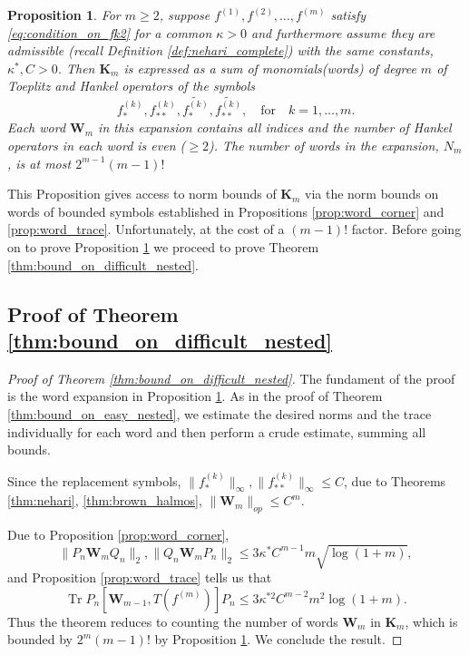 \documentclass[11pt]{amsart}
\theoremstyle{plain}
\newtheorem{proposition}[theorem]{Proposition}
\theoremstyle{remark}
\DeclareMathOperator{\Tr}{Tr}
\numberwithin{equation}{section}
\begin{document}
\begin{proposition}\label{prop:structure_of_nehari_family}
For $m\geq 2$, suppose $f^{(1)}, f^{(2)}, \ldots, f^{(m)}
$ satisfy \eqref{eq:condition_on_fk2} for a common $\kappa>0$ and furthermore assume they are admissible (recall Definition \ref{def:nehari_complete}) with the same constants, $\kappa^*, C>0$.
Then $\mathbf{K}_m$
%
%
is expressed as a sum of monomials(words) of degree $m$ of Toeplitz and Hankel operators of the symbols
$$f^{(k)}_*, f^{(k)}_{**}, \widetilde{f^{(k)}_*}, \widetilde{f^{(k)}_{**}},\quad \text{for}\quad k=1,\ldots, m.$$ 
%
%
%
Each word $\mathbf{W}_m$ in this expansion contains all indices and
the number of Hankel operators in each word is even ($\geq 2$).
The number of words in the expansion, $N_m$, is at most $2^{m-1} (m-1)!$
\end{proposition}
%
This Proposition gives access to norm bounds of $\mathbf{K}_m$ via the norm bounds on words of bounded symbols established in Propositions \ref{prop:word_corner} and \ref{prop:word_trace}. Unfortunately, at the cost of a $(m-1)!$ factor. Before going on to prove Proposition \ref{prop:structure_of_nehari_family} we proceed to prove Theorem \ref{thm:bound_on_difficult_nested}.

\subsection{Proof of Theorem \ref{thm:bound_on_difficult_nested}}
\begin{proof}[Proof of Theorem \ref{thm:bound_on_difficult_nested}]
The fundament of the proof is the word expansion in Proposition \ref{prop:structure_of_nehari_family}. As in the proof of Theorem \ref{thm:bound_on_easy_nested}, we estimate the desired norms and the trace individually for each word and then perform a crude estimate, summing all bounds.

Since the replacement symbols, $\|f_*^{(k)}\|_{\infty}, \|f_{**}^{(k)}\|_{\infty}\leq C$, due to Theorems \ref{thm:nehari}, \ref{thm:brown_halmos}, $\|\mathbf{W}_m\|_{op}\leq C^m$.
%

Due to Proposition \ref{prop:word_corner},
$$\|P_n\mathbf{W}_mQ_n\|_2, \|Q_n\mathbf{W}_mP_n\|_2\leq 3\kappa^* C^{m-1} m \sqrt{\log(1+m)},$$
and Proposition \ref{prop:word_trace} tells us that
$$\Tr  P_n[\mathbf{W}_{m-1}, T(f^{(m)})]P_n
\leq
3 \kappa^{*2}  C^{m-2} m^2 \log(1+m).$$
Thus the theorem reduces to counting the number of words  $\mathbf{W}_{m}$ in $\mathbf{K}_m$, which is bounded by $2^m(m-1)!$ by Proposition \ref{prop:structure_of_nehari_family}. We conclude the result.
\end{proof}
%
%
%
\end{document}
